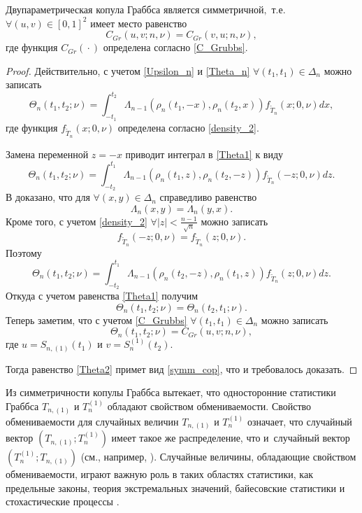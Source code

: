 \begin{theorem}[2]Двупараметрическая копула Граббса является симметричной$,$ т$.$е$.$  $\forall (u,v)\in[0,1]^2$ имеет место равенство
\begin{equation}
\label{symm_cop}
C_{Gr}(u,v;n,\nu)=C_{Gr}(v,u;n,\nu),
\end{equation}
где функция $C_{Gr}({}\cdot{})$ определена согласно \rm \eqref{C_Grubbs}.
\end{theorem}

\smallskip

\begin{proof} Действительно, с учетом \eqref{Upsilon_n}  и  \eqref{Theta_n} $\forall (t_1,t_1)\in \Delta_n$  можно записать
\begin{equation}
\label{Theta1}
\Theta_n(t_1,t_2;\nu)=
\int _{-t_1}^{t_2}\Lambda_{n-1}
\left(\rho_{n}(t_1,-x),\rho_{n}(t_2,x)\right)f_{\widetilde{T}_n}(x;0,\nu)dx,
\end{equation}
где функция $f_{\widetilde{T}_n}(x;0,\nu)$ определена согласно \eqref{density_2}.

Замена переменной $z=-x$ приводит  интеграл в \eqref{Theta1} к виду
$$
\Theta_n(t_1,t_2;\nu)=
\int _{-t_2}^{t_1}\Lambda_{n-1}
\left(\rho_{n}(t_1,z),\rho_{n}(t_2,-z)\right)f_{\widetilde{T}_n}(-z;0,\nu)dz.
$$
В \cite{ShirIZVUZ2014} доказано, что для $\forall (x,y)\in \Delta_n$ справедливо равенство 
$$\Lambda_{n}(x,y)=\Lambda_{n}(y,x).$$
Кроме того, с учетом  \eqref{density_2}  $\forall |z|<\frac{n-1}{\sqrt{n}}$  можно записать 
$$f_{\widetilde{T}_n}(-z;0,\nu)=f_{\widetilde{T}_n}(z;0,\nu).$$ 
Поэтому
$$
\Theta_n(t_1,t_2;\nu)=
\int _{-t_2}^{t_1}\Lambda_{n-1}
\left(\rho_{n}(t_2,-z),\rho_{n}(t_1,z)\right)f_{\widetilde{T}_n}(z;0,\nu)dz.
$$
Откуда с учетом равенства  \eqref{Theta1} получим
 \begin{equation}
\label{Theta2}
\Theta_n(t_1,t_2;\nu)=\Theta_n(t_2,t_1;\nu).
\end{equation}
Теперь заметим, что с учетом \eqref{C_Grubbs} $\forall (t_1,t_1)\in \Delta_n$ можно записать
$$
\Theta_n(t_1,t_2;\nu)=C_{Gr}(u,v;n,\nu),
$$
где $u=S_{n,(1)}(t_1)$ и $v=S_{n}^{(1)}(t_2)$.

Тогда равенство \eqref{Theta2} примет вид \eqref{symm_cop}, что и требовалось доказать. \hfill
\end{proof}

\smallskip

Из симметричности копулы Граббса вытекает, что односторонние статистики Граббса
$T_{n,(1)}$ и  $T_{n}^{(1)}$ обладают свойством обмениваемости.
Свойство обмениваемости для случайных величин $T_{n,(1)}$ и  $T_{n}^{(1)}$ означает,
что случайный вектор $(T_{n,(1)};T_{n}^{(1)})$  имеет такое же распределение, что и~случайный вектор $(T_{n}^{(1)};T_{n,(1)})$ (см., например, \cite[p.~2137]{Galambos}).
Случайные величины, обладающие свойством обмениваемости, играют важную роль в таких областях статистики,
как предельные законы, теория экстремальных значений, байе\-совские статистики и стохастические процессы
\cite[pp.~2136--2140]{Galambos}.


